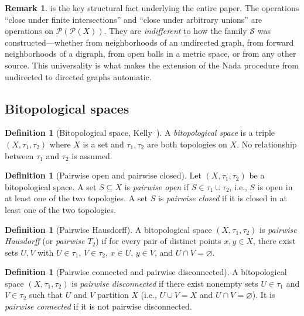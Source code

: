 \documentclass[11pt,a4paper]{article}
\theoremstyle{plain}
\theoremstyle{definition}
\newtheorem{definition}[theorem]{Definition}
\newtheorem{remark}[theorem]{Remark}
\newcommand{\powerset}{\mathcal{P}}
\newcommand{\subbase}{\mathcal{S}}
\begin{document}
\begin{remark}\label{rem:universality}
 is the key structural fact underlying the entire
paper.  The operations ``close under finite intersections'' and ``close under
arbitrary unions'' are operations on $\powerset(\powerset(X))$.  They are
\emph{indifferent} to how the family $\subbase$ was constructed---whether from
neighborhoods of an undirected graph, from forward neighborhoods of a digraph,
from open balls in a metric space, or from any other source.  This universality
is what makes the extension of the Nada procedure from undirected to directed
graphs automatic.
\end{remark}

\subsection{Bitopological spaces}\label{subsec:bitopology}

\begin{definition}[Bitopological space, Kelly~\cite{Kelly1963}]\label{def:bitopology}
A \emph{bitopological space} is a triple $(X, \tau_1, \tau_2)$ where $X$ is a
set and $\tau_1, \tau_2$ are both topologies on $X$.  No relationship between
$\tau_1$ and $\tau_2$ is assumed.
\end{definition}

\begin{definition}[Pairwise open and pairwise closed]\label{def:pairwise-open}
Let $(X, \tau_1, \tau_2)$ be a bitopological space.  A set $S \subseteq X$ is
\emph{pairwise open} if $S \in \tau_1 \cup \tau_2$, i.e., $S$ is open in at
least one of the two topologies.  A set $S$ is \emph{pairwise closed} if it is
closed in at least one of the two topologies.
\end{definition}

\begin{definition}[Pairwise Hausdorff]\label{def:pairwise-hausdorff}
A bitopological space $(X, \tau_1, \tau_2)$ is \emph{pairwise Hausdorff}
(or \emph{pairwise $T_2$}) if for every pair of distinct points $x, y \in X$,
there exist sets $U, V$ with $U \in \tau_1$, $V \in \tau_2$, $x \in U$,
$y \in V$, and $U \cap V = \varnothing$.
\end{definition}

\begin{definition}[Pairwise connected and pairwise disconnected]\label{def:pairwise-connected}
A bitopological space $(X, \tau_1, \tau_2)$ is \emph{pairwise disconnected} if
there exist nonempty sets $U \in \tau_1$ and $V \in \tau_2$ such that $U$ and
$V$ partition $X$ (i.e., $U \cup V = X$ and $U \cap V = \varnothing$).
It is \emph{pairwise connected} if it is not pairwise disconnected.
\end{definition}
\end{document}
